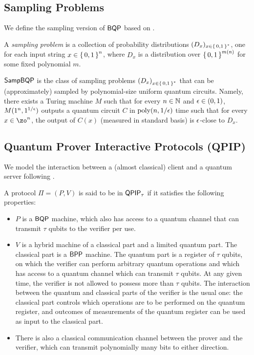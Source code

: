 \subsection{Sampling Problems}

We define the sampling version of $\operatorname{\mathsf{BQP}}$ based on \cite{aaronson_2013}.

\begin{definition} 
	\label{dfn:sampling-problem}
	A \emph{sampling problem} is a collection of probability distributions $(D_x)_{x\in\set{0, 1}^*}$, one for each input string $x\in\set{0,1}^n$, where $D_x$ is a distribution over $\set{0,1}^{m(n)}$ for some fixed polynomial $m$.
\end{definition}

\begin{definition} [$\SampBQP$]
	$\SampBQP$ is the class of sampling problems $\left(D_x\right)_{x\in\set{0, 1}^*}$ that can be (approximately) sampled by polynomial-size uniform quantum circuits. Namely, there exists a Turing machine $M$ such that for every $n \in \mathbb{N}$ and $\epsilon \in (0,1)$, $M(1^n, 1^{1/\epsilon})$ outputs a quantum circuit $C$ in $\operatorname*{\operatorname{poly}}(n, 1/\epsilon)$ time such that for every $x \in \zo^n$, the output of $C(x)$ (measured in standard basis) is $\epsilon$-close to $D_x$.
\end{definition}

\subsection{Quantum Prover Interactive Protocols (QPIP)}


We model the interaction between a (almost classical) client and a quantum server following \cite{FOCS:Mahadev18a}.

\begin{definition}
	A protocol $\Pi=(P, V)$ is said to be in $\operatorname{\mathsf{QPIP}}_\tau$ if it satisfies the following properties:
	\begin{itemize}
		\item $P$ is a $\operatorname{\mathsf{BQP}}$ machine, which also has access to a quantum channel that can transmit $\tau$ qubits to the verifier per use.
		\item $V$ is a hybrid machine of a classical part and a limited quantum part. The classical part is a $\operatorname{\mathsf{BPP}}$ machine. The quantum part is a register of $\tau$ qubits, on which the verifier can perform arbitrary quantum operations and which has access to a quantum channel which can transmit $\tau$ qubits. At any given time, the verifier is not allowed to possess more than $\tau$ qubits. The interaction between the quantum and classical parts of the verifier is the usual one: the classical part controls which operations are to be performed on the quantum register, and outcomes of measurements of the quantum register can be used as input to the classical part.
		\item There is also a classical communication channel between the prover and the verifier, which can transmit polynomially many bits to either direction.
	\end{itemize}
\end{definition}


